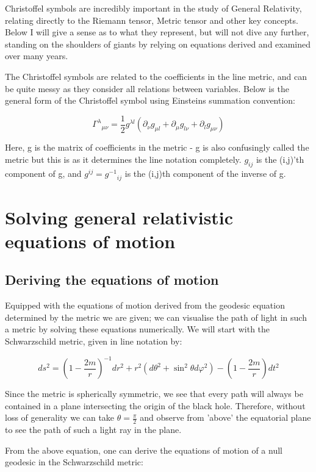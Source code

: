 \documentclass[oneside,openright,frontopenright]{dmathesis}
\begin{document}
	Christoffel symbols are incredibly important in the study of General Relativity, relating directly to the Riemann tensor, Metric tensor and other key concepts. Below I will give a sense as to what they represent, but will not dive any further, standing on the shoulders of giants by relying on equations derived and examined over many years.

	The Christoffel symbols are related to the coefficients in the line metric, and can be quite messy as they consider all relations between variables. Below is the general form of the Christoffel symbol using Einsteins summation convention\cite{albert1916foundation}:
	
	\[{\Gamma^\lambda}_{\mu\nu} = \frac{1}{2}g^{\lambda{l}}(\partial_{\nu}g_{\mu{l}} + \partial_{\mu}g_{l\nu} + \partial_{l}g_{\mu\nu})\]
	
	Here, g is the matrix of coefficients in the metric - g is also confusingly called the metric but this is as it determines the line notation completely. $g_{ij}$ is the (i,j)'th component of g, and $g^{ij} = {g^{-1}}_{ij}$ is the (i,j)th component of the inverse of g.

\chapter{Solving general relativistic equations of motion}
\section{Deriving the equations of motion}
	Equipped with the equations of motion derived from the geodesic equation determined by the metric we are given; we can visualise the path of light in such a metric by solving these equations numerically. We will start with the Schwarzschild metric, given in line notation by\cite{derivation_of_schwarzschild}: 


	\[{ds^{2} = {(1-\frac {2m}{r})}^{-1}} {dr^2} + {r^2}({d\theta ^2} + {\sin ^2}{\theta}{d\varphi ^2}) -{(1-\frac {2m}{r})}{dt^2}\]


	Since the metric is spherically symmetric, we see that every path will always be contained in a plane intersecting the origin of the black hole. Therefore, without loss of generality we can take ${\theta}=\frac{\pi}{2}$ and observe from 'above’ the equatorial plane to see the path of such a light ray in the plane.

	From the above equation, one can derive the equations of motion of a null geodesic in the Schwarzschild metric:
\end{document}
